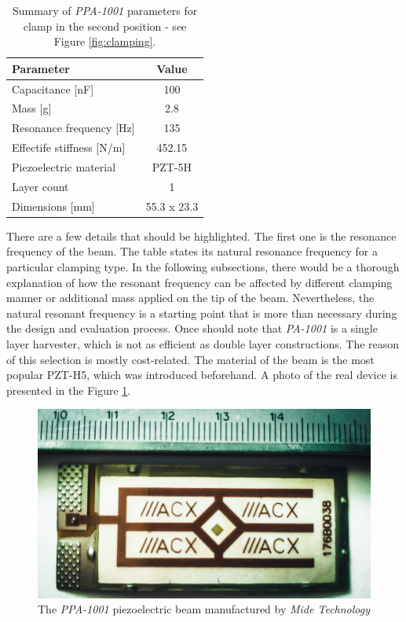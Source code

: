 \documentclass[12pt,a4paper]{article}
\begin{document}
\begin{table}[ht!]
\begin{tabular}{|l|c|}
\hline
\textbf{Parameter}              & \textbf{Value} \\ \hline
Capacitance [nF] & 100         \\ \hline
Mass [g]                 & 2.8        \\ \hline
Resonance frequency [Hz]               & 135 \\ \hline
Effectife stiffness [N/m]     & 452.15           \\ \hline
Piezoelectric material                    & PZT-5H \\ \hline
Layer count                   & 1 \\ \hline
Dimensions [mm]                  & 55.3 x 23.3 \\ \hline
\end{tabular}
\caption{Summary of \textit{PPA-1001} parameters \cite{PPA} for clamp in the second position - see Figure \ref{fig:clamping}.}
\label{tab:ppaparams}
\end{table}

There are a few details that should be highlighted. The first one is the resonance frequency of the beam. The table states its natural resonance frequency for a particular clamping type. In the following subsections, there would be a thorough explanation of how the resonant frequency can be affected by different clamping manner or additional mass applied on the tip of the beam. Nevertheless, the natural resonant frequency is a starting point that is more than necessary during the design and evaluation process. Once should note that \textit{PA-1001} is a single layer harvester, which is not as efficient as double layer constructions. The reason of this selection is mostly cost-related. The material of the beam is the most popular PZT-H5, which was introduced beforehand. A photo of the real device is presented in the Figure \ref{fig:ppa}.

\begin{figure}[ht!]
\includegraphics[scale=0.1]{ppa.jpg}
\caption{The \textit{PPA-1001} piezoelectric beam manufactured by \textit{Mide Technology}}
\label{fig:ppa}
\end{figure}
\end{document}

